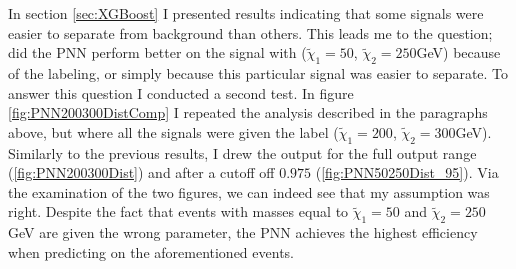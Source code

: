 In section \ref{sec:XGBoost} I presented results indicating that some signals were easier to separate from background than others. This leads me to the 
question; did the \ac{PNN} perform better on the signal with ($\tilde{\chi}_1=50$, $\tilde{\chi}_2=250$GeV) because of the labeling, or simply
because this particular signal was easier to separate. To answer this question I conducted a second test. In figure \ref{fig:PNN200300DistComp} 
I repeated the analysis described in the paragraphs above, but where all the signals were given the label ($\tilde{\chi}_1=200$, $\tilde{\chi}_2=300$GeV).
Similarly to the previous results, I drew the output for the full output range (\ref{fig:PNN200300Dist}) and after a cutoff off $0.975$ (\ref{fig:PNN50250Dist_95}).
Via the examination of the two figures, we can indeed see that my assumption was right. Despite the fact that events with masses equal to $\tilde{\chi}_1=50$ and $\tilde{\chi}_2=250$GeV
are given the wrong parameter, the \ac{PNN} achieves the highest efficiency when predicting on the aforementioned events. \\
